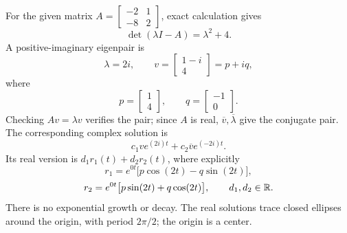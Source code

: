 For the given matrix $A=\left[\begin{matrix}-2 & 1\\-8 & 2\end{matrix}\right]$, exact calculation gives
\[\det(\lambda I-A)=\lambda^{2} + 4.\]
A positive-imaginary eigenpair is
\[\lambda=2 i,\qquad v=\left[\begin{matrix}1 - i\\4\end{matrix}\right]=p+iq,\]
where
\[p=\left[\begin{matrix}1\\4\end{matrix}\right],\qquad q=\left[\begin{matrix}-1\\0\end{matrix}\right].\]
Checking $Av=\lambda v$ verifies the pair; since $A$ is real,
$\overline v,\overline\lambda$ give the conjugate pair.
The corresponding complex solution is
\[c_1ve^{(2 i)t}+c_2\overline v e^{(- 2 i)t}.
\]
Its real version is $d_1r_1(t)+d_2r_2(t)$, where explicitly
\[r_1=e^{0t}\bigl[p\cos(2t)-q\sin(2t)\bigr],\]
\[r_2=e^{0t}\bigl[p\sin(2t)+q\cos(2t)\bigr],\qquad d_1,d_2\in\mathbb{R}.\]
There is no exponential growth or decay. The real solutions trace
closed ellipses around the origin, with period $2\pi/2$;
the origin is a center.

